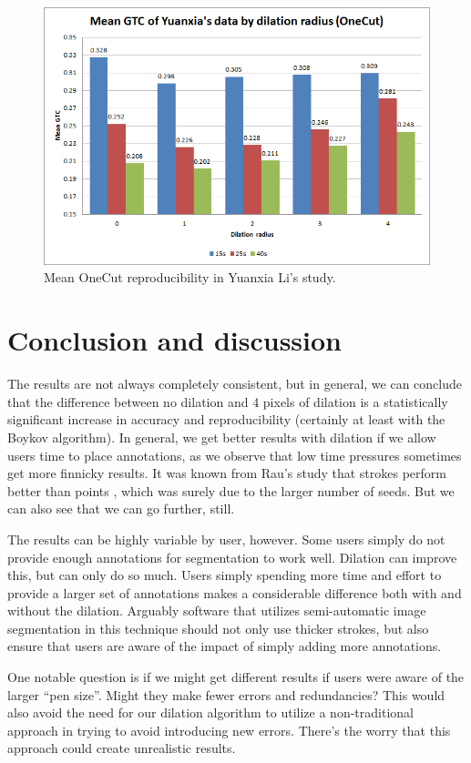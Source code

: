 \documentclass[12pt,a4paper,notitlepage]{article}
\begin{document}
\begin{figure}[H]
	\includegraphics[width=.9\linewidth]{yuanxia_onecut_gtc}
	\caption{Mean OneCut reproducibility in Yuanxia Li's study.}
	\label{fig:yuanxia_onecut_gtc}
\end{figure}

\section{Conclusion and discussion}
The results are not always completely consistent, but in general, we can conclude that the difference between no dilation and 4 pixels of dilation is a statistically significant increase in accuracy and reproducibility (certainly at least with the Boykov algorithm). In general, we get better results with dilation if we allow users time to place annotations, as we observe that low time pressures sometimes get more finnicky results. It was known from Rau's study that strokes perform better than points \cite{rau}, which was surely due to the larger number of seeds. But we can also see that we can go further, still.

The results can be highly variable by user, however. Some users simply do not provide enough annotations for segmentation to work well. Dilation can improve this, but can only do so much. Users simply spending more time and effort to provide a larger set of annotations makes a considerable difference both with and without the dilation. Arguably software that utilizes semi-automatic image segmentation in this technique should not only use thicker strokes, but also ensure that users are aware of the impact of simply adding more annotations.

One notable question is if we might get different results if users were aware of the larger ``pen size''. Might they make fewer errors and redundancies? This would also avoid the need for our dilation algorithm to utilize a non-traditional approach in trying to avoid introducing new errors. There's the worry that this approach could create unrealistic results.
\end{document}
